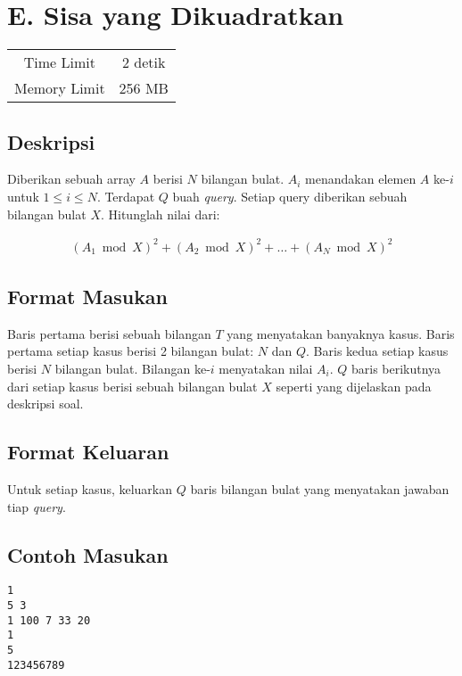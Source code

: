 \documentclass{article}
\begin{document}
\section*{\hfil E. Sisa yang Dikuadratkan\hfil}

\begin{center}
\begin{tabular}{ |cc| } 
 \hline
 Time Limit & 2 detik \\ 
 Memory Limit & 256 MB \\
 \hline
\end{tabular}
\end{center}

\subsection*{Deskripsi}
Diberikan sebuah array $A$ berisi $N$ bilangan bulat. $A_{i}$ menandakan elemen $A$ ke-$i$ untuk $1 \leq i \leq N$. Terdapat $Q$ buah \textit{query}. Setiap query diberikan sebuah bilangan bulat $X$. Hitunglah nilai dari:

\begin{gather*} 
(A_{1} \bmod X)^2 + (A_{2} \bmod X)^2 + \dots + (A_{N} \bmod X)^2
\end{gather*} 

\subsection*{Format Masukan}
\par Baris pertama berisi sebuah bilangan $T$ yang menyatakan banyaknya kasus.
\newline Baris pertama setiap kasus berisi 2 bilangan bulat: $N$ dan $Q$.
\newline Baris kedua setiap kasus berisi $N$ bilangan bulat. Bilangan ke-$i$ menyatakan nilai $A_{i}$.
\newline $Q$ baris berikutnya dari setiap kasus berisi sebuah bilangan bulat $X$ seperti yang dijelaskan pada deskripsi soal.

\subsection*{Format Keluaran}

\par Untuk setiap kasus, keluarkan $Q$ baris bilangan bulat yang menyatakan jawaban tiap \textit{query}.

\subsection*{Contoh Masukan}
\begin{lstlisting}
1
5 3
1 100 7 33 20
1
5
123456789
\end{lstlisting}
\end{document}
